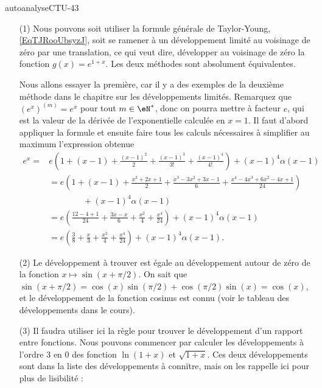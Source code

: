
\begin{corrige}{autoanalyseCTU-43}

  \begin{enumerate}
  \item[(1)] Nous pouvons soit utiliser la formule générale de Taylor-Young, \eqref{EqTJRooUbsyzJ}, soit se ramener à un développement limité au voisinage de zéro par une translation, ce qui veut dire, développer  au voisinage de zéro la fonction $g(x) = e^{1+x}$. Les deux méthodes sont absolument équivalentes.  

Nous allons essayer la première, car il y a des exemples de la deuxième méthode dans le chapitre sur les développements limités. Remarquez que $(e^x)^{(m)} = e^x$ pour tout $m\in\eN^*$, donc on pourra mettre à facteur $e$, qui est la valeur de la dérivée de l'exponentielle calculée en $x=1$. Il faut d'abord appliquer la formule et ensuite faire tous les calculs nécessaires à simplifier au maximum l'expression obtenue 
\begin{equation*}
  \begin{aligned}
    e^{x} = & e\left(1+(x-1) + \frac{(x-1)^2}{2} + \frac{(x-1)^3}{3!} + \frac{(x-1)^4}{4!} \right)  + (x-1)^4\alpha(x-1) \\
    &  =e\left(1+(x-1) + \frac{x^2+2x+1}{2} + \frac{x^3-3x^2 +3x-1}{6} + \frac{x^4-4x^3+6x^2-4x+1}{24} \right) \\
    &\qquad\qquad + (x-1)^4\alpha(x-1) \\
    &  =e\left( \frac{12-4+1}{24} + \frac{3x-x}{6} + \frac{x^2}{4} + \frac{x^4}{24}\right)  + (x-1)^4\alpha(x-1) \\
    &  =e\left( \frac{3}{8} + \frac{x}{3} + \frac{x^2}{4} + \frac{x^4}{24}\right)  + (x-1)^4\alpha(x-1) .
  \end{aligned}
\end{equation*}
 \item[(2)] Le développement à trouver est égale au développement autour de zéro de la fonction $x\mapsto \sin(x+\pi/2)$. On sait que $\sin(x+\pi/2) = \cos(x)\sin(\pi/2) + \cos(\pi/2)\sin(x) = \cos(x)$, et le développement de la fonction cosinus est connu (voir le tableau des développements dans le cours).
  \item[(3)] Il faudra utiliser ici la règle pour trouver le développement d'un rapport entre fonctions. Nous pouvons commencer par calculer les développements à l'ordre 3 en 0 des fonction $\ln(1+x)$ et $\sqrt{1+x}$. Ces deux développements sont dans la liste des développements à conn\"{i}tre, mais on les rappelle ici pour plus de lisibilité :

\end{enumerate}
\end{corrige}
